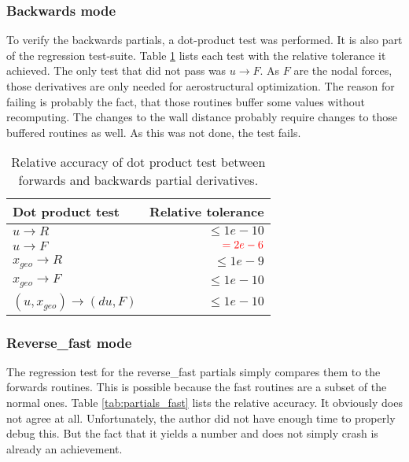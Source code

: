 \subsubsection{Backwards mode}
\label{subsubsec:backwards_ad}
To verify the backwards partials, a dot-product test was performed. It is also
part of the regression test-suite. Table \ref{tab:partials_dotproduct_test}
lists each test with the relative tolerance it achieved. The only test that
did not pass was $u \rightarrow F$. As $F$ are the nodal forces, those
derivatives are only needed for aerostructural optimization. The reason for
failing is probably the fact, that those routines buffer some values without
recomputing. The changes to the wall distance probably require changes to those
buffered routines as well. As this was not done, the test fails.

\begin{table}[H]
    \centering
    \begin{tabular}{l r}
        \toprule
        Dot product test                     & Relative tolerance \\
        \toprule
        $u \rightarrow R$                   & $\leq 1e-10$ \\
        $u \rightarrow F$                   & $\textcolor{red}{= 2e-6}$ \\
        \midrule
        $x_{geo} \rightarrow R$             & $\leq 1e-9$ \\
        $x_{geo} \rightarrow F$             & $\leq 1e-10$ \\
        \midrule
        $(u, x_{geo}) \rightarrow (du, F)$  & $\leq 1e-10$ \\
        \bottomrule
    \end{tabular}
    \caption{Relative accuracy of dot product test between forwards and
    backwards partial derivatives.}
    \label{tab:partials_dotproduct_test}
\end{table}


\subsubsection{Reverse\_fast mode}
\label{subsubsec:backwards_fast_ad}
The regression test for the reverse\_fast partials simply compares them to the
forwards routines. This is possible because the fast routines are a subset of
the normal ones. Table \ref{tab:partials_fast} lists the relative accuracy. It
obviously does not agree at all. Unfortunately, the author did not have enough
time to properly debug this. But the fact that it yields a number and does not
simply crash is already an achievement.

